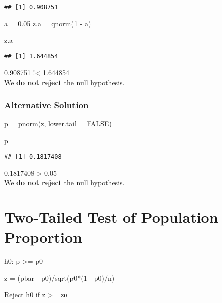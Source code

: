 \documentclass[
]{article}
\newenvironment{Shaded}{\begin{snugshade}}{\end{snugshade}}
\newcommand{\AttributeTok}[1]{\textcolor[rgb]{0.77,0.63,0.00}{#1}}
\newcommand{\ConstantTok}[1]{\textcolor[rgb]{0.00,0.00,0.00}{#1}}
\newcommand{\DecValTok}[1]{\textcolor[rgb]{0.00,0.00,0.81}{#1}}
\newcommand{\FloatTok}[1]{\textcolor[rgb]{0.00,0.00,0.81}{#1}}
\newcommand{\FunctionTok}[1]{\textcolor[rgb]{0.00,0.00,0.00}{#1}}
\newcommand{\NormalTok}[1]{#1}
\newcommand{\OtherTok}[1]{\textcolor[rgb]{0.56,0.35,0.01}{#1}}
\newcommand{\SpecialCharTok}[1]{\textcolor[rgb]{0.00,0.00,0.00}{#1}}
\begin{document}
\begin{verbatim}
## [1] 0.908751
\end{verbatim}

\begin{Shaded}
\begin{Highlighting}[]
\NormalTok{a }\OtherTok{=} \FloatTok{0.05}
\NormalTok{z.a }\OtherTok{=} \FunctionTok{qnorm}\NormalTok{(}\DecValTok{1} \SpecialCharTok{{-}}\NormalTok{ a)}

\NormalTok{z.a}
\end{Highlighting}
\end{Shaded}

\begin{verbatim}
## [1] 1.644854
\end{verbatim}

0.908751 !\textless{} 1.644854\\
We \textbf{do not reject} the null hypothesis.

\hypertarget{alternative-solution-1}{%
\subsubsection{Alternative Solution}\label{alternative-solution-1}}

\begin{Shaded}
\begin{Highlighting}[]
\NormalTok{p }\OtherTok{=} \FunctionTok{pnorm}\NormalTok{(z, }\AttributeTok{lower.tail =} \ConstantTok{FALSE}\NormalTok{)}

\NormalTok{p}
\end{Highlighting}
\end{Shaded}

\begin{verbatim}
## [1] 0.1817408
\end{verbatim}

0.1817408 \textgreater{} 0.05\\
We \textbf{do not reject} the null hypothesis.

\hypertarget{two-tailed-test-of-population-proportion}{%
\section{Two-Tailed Test of Population
Proportion}\label{two-tailed-test-of-population-proportion}}

h0: p \textgreater= p0

z = (pbar - p0)/sqrt(p0*(1 - p0)/n)

Reject h0 if z \textgreater= \textbar{} zα \textbar{}
\end{document}
